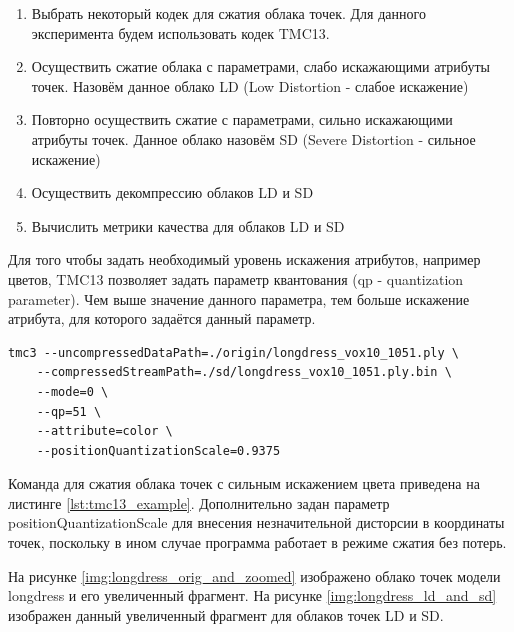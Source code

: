 \begin{enumerate}
    \item Выбрать некоторый кодек для сжатия облака точек. Для данного
    эксперимента будем использовать кодек TMC13.
    \item Осуществить сжатие облака с параметрами, слабо искажающими атрибуты
    точек. Назовём данное облако LD (Low Distortion - слабое искажение)
    \item Повторно осуществить сжатие с параметрами, сильно искажающими атрибуты
    точек. Данное облако назовём SD (Severe Distortion - сильное искажение)
    \item Осуществить декомпрессию облаков LD и SD
    \item Вычислить метрики качества для облаков LD и SD
\end{enumerate}

Для того чтобы задать необходимый уровень искажения атрибутов, например цветов,
TMC13 позволяет задать параметр квантования (qp - quantization parameter). Чем
выше значение данного параметра, тем больше искажение атрибута, для которого
задаётся данный параметр.

\begin{lstlisting}[caption={
    Пример сжатия облака точек посредством кодека TMC13, используются параметры,
    обеспечивающие сильное искажение цвета.
}, label={lst:tmc13_example}]
tmc3 --uncompressedDataPath=./origin/longdress_vox10_1051.ply \
	--compressedStreamPath=./sd/longdress_vox10_1051.ply.bin \
	--mode=0 \
	--qp=51 \
	--attribute=color \
	--positionQuantizationScale=0.9375
\end{lstlisting}

Команда для сжатия облака точек с сильным искажением цвета приведена на листинге
\ref{lst:tmc13_example}. Дополнительно задан параметр positionQuantizationScale
для внесения незначительной дисторсии в координаты точек, поскольку в ином
случае программа работает в режиме сжатия без потерь.



На рисунке \ref{img:longdress_orig_and_zoomed} изображено облако точек модели
longdress и его увеличенный фрагмент. На рисунке \ref{img:longdress_ld_and_sd}
изображен данный увеличенный фрагмент для облаков точек LD и SD.

